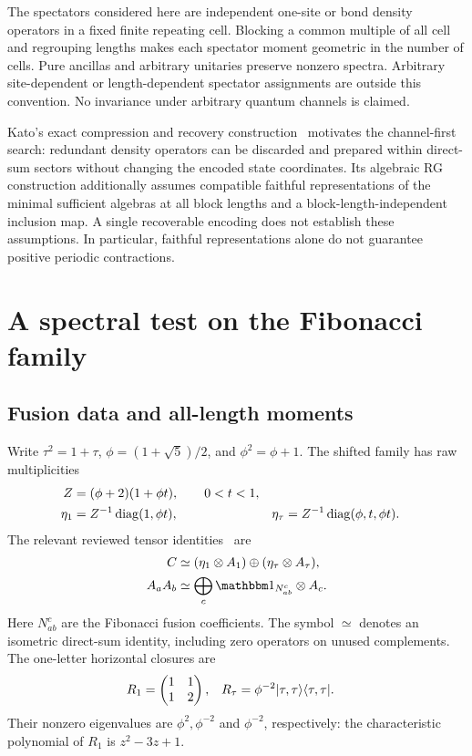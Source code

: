 \documentclass[aps,pra,reprint,nofootinbib,onecolumn]{revtex4-2}
\begin{document}
The spectators considered here are independent one-site or bond density
operators in a fixed finite repeating cell. Blocking a common multiple
of all cell and regrouping lengths makes each spectator moment
geometric in the number of cells. Pure ancillas and arbitrary unitaries
preserve nonzero spectra. Arbitrary site-dependent or length-dependent
spectator assignments are outside this convention. No invariance under
arbitrary quantum channels is claimed.

Kato's exact compression and recovery construction~\cite{Kato} motivates
the channel-first search: redundant density operators can be discarded
and prepared within direct-sum sectors without changing the encoded
state coordinates. Its algebraic RG construction additionally assumes
compatible faithful representations of the minimal sufficient algebras
at all block lengths and a block-length-independent inclusion map.
A single recoverable encoding does not establish these assumptions.
In particular, faithful representations alone do not guarantee positive
periodic contractions.

\section{A spectral test on the Fibonacci family}
\label{sec:spectral}

\subsection{Fusion data and all-length moments}

Write $\tau^2=1+\tau$, $\phi=(1+\sqrt5)/2$, and $\phi^2=\phi+1$.
The shifted family has raw multiplicities
\begin{align}
	Z         & =(\phi+2)(1+\phi t),\qquad 0<t<1,
	\nonumber                                       \\
	\eta_1    & =Z^{-1}\operatorname{diag}(1,\phi t),           &
	\eta_\tau & =Z^{-1}\operatorname{diag}(\phi,t,\phi t).
	\label{eq:eta}
\end{align}
The relevant reviewed tensor identities~\cite{Reviewed} are
\begin{align}
	C      & \simeq(\eta_1\otimes A_1)\oplus(\eta_\tau\otimes A_\tau),
	\nonumber                                                          \\
	A_aA_b & \simeq\bigoplus_c\Id_{N_{ab}^c}\otimes A_c.
	\label{eq:fib-input}
\end{align}
Here $N_{ab}^c$ are the Fibonacci fusion coefficients. The symbol
$\simeq$ denotes an isometric direct-sum identity, including zero
operators on unused complements. The one-letter horizontal closures are
\begin{align}
	R_1    & =\begin{pmatrix}1&1\\1&2\end{pmatrix},    &
	R_\tau & =\phi^{-2}\lvert\tau,\tau\rangle\langle\tau,\tau\rvert.
	\label{eq:fib-seeds}
\end{align}
Their nonzero eigenvalues are $\phi^2,\phi^{-2}$ and $\phi^{-2}$,
respectively: the characteristic polynomial of $R_1$ is $z^2-3z+1$.
\end{document}
